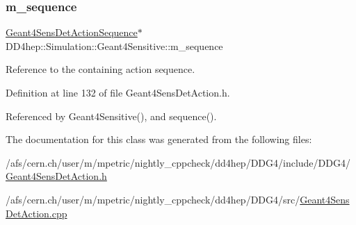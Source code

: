 \hypertarget{class_d_d4hep_1_1_simulation_1_1_geant4_sensitive_a7c98977dbb602b8053f21ff8e36f925d}{}\label{class_d_d4hep_1_1_simulation_1_1_geant4_sensitive_a7c98977dbb602b8053f21ff8e36f925d} 
\subsubsection{\texorpdfstring{m\+\_\+sequence}{m\_sequence}}
{\footnotesize\ttfamily \hyperlink{class_d_d4hep_1_1_simulation_1_1_geant4_sens_det_action_sequence}{Geant4\+Sens\+Det\+Action\+Sequence}$\ast$ D\+D4hep\+::\+Simulation\+::\+Geant4\+Sensitive\+::m\+\_\+sequence\hspace{0.3cm}{\ttfamily [private]}}



Reference to the containing action sequence. 



Definition at line 132 of file Geant4\+Sens\+Det\+Action.\+h.



Referenced by Geant4\+Sensitive(), and sequence().



The documentation for this class was generated from the following files\+:\begin{DoxyCompactItemize}
\item 
/afs/cern.\+ch/user/m/mpetric/nightly\+\_\+cppcheck/dd4hep/\+D\+D\+G4/include/\+D\+D\+G4/\hyperlink{_geant4_sens_det_action_8h}{Geant4\+Sens\+Det\+Action.\+h}\item 
/afs/cern.\+ch/user/m/mpetric/nightly\+\_\+cppcheck/dd4hep/\+D\+D\+G4/src/\hyperlink{_geant4_sens_det_action_8cpp}{Geant4\+Sens\+Det\+Action.\+cpp}\end{DoxyCompactItemize}
